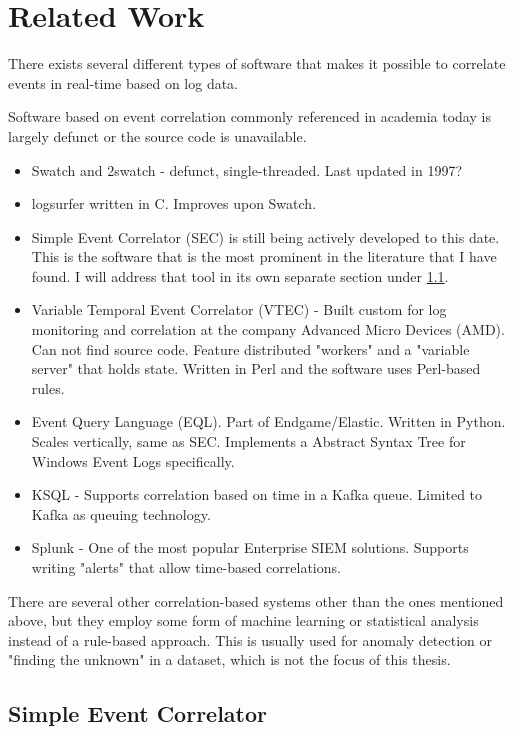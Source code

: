 \chapter{Related Work}
\label{chap:relatedwork}


There exists several different types of software that makes it possible to correlate events in real-time based on log data.

Software based on event correlation commonly referenced in academia today is largely defunct or the source code is unavailable. 

\begin{itemize}
    \item Swatch and 2swatch - defunct, single-threaded. Last updated in 1997?
    \item logsurfer \cite{thompson_2017} written in C. Improves upon Swatch.
    \item Simple Event Correlator (SEC) is still being actively developed to this date. This is the software that is the most prominent in the literature that I have found. I will address that tool in its own separate section under \ref{sec:SEC}.
    \item Variable Temporal Event Correlator (VTEC) - Built custom for log monitoring and correlation at the company Advanced Micro Devices (AMD). Can not find source code. Feature distributed "workers" and a "variable server" that holds state. Written in Perl and the software uses Perl-based rules.
    \item Event Query Language (EQL). Part of Endgame/Elastic. Written in Python. Scales vertically, same as SEC. Implements a Abstract Syntax Tree for Windows Event Logs specifically.
    \item KSQL - Supports correlation based on time in a Kafka queue. Limited to Kafka as queuing technology.
    \item Splunk - One of the most popular Enterprise SIEM solutions. Supports writing "alerts" that allow time-based correlations.
\end{itemize}
There are several other correlation-based systems other than the ones mentioned above, but they employ some form of machine learning or statistical analysis instead of a rule-based approach. This is usually used for anomaly detection or "finding the unknown" in a dataset, which is not the focus of this thesis.

\section{Simple Event Correlator}
\label{sec:SEC}

